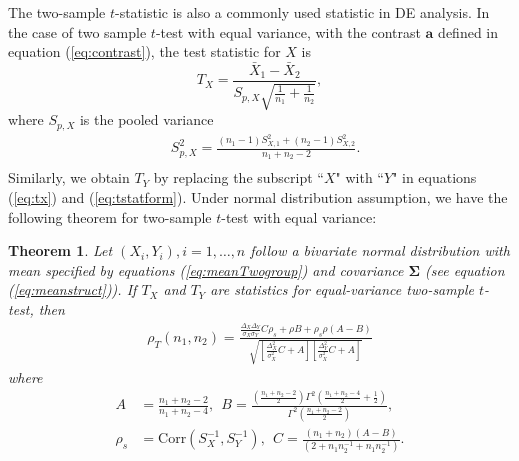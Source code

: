 \documentclass[12pt, a4paper]{article}
\newtheorem{theorem}{Theorem}       %
\newcommand{\cor}{\text{Corr}}
\begin{document}
The two-sample $t$-statistic is also a commonly used statistic in DE 
analysis. In the case of two sample $t$-test with equal variance, with the contrast $\bm a$ 
defined in equation (\ref{eq:contrast}), the test statistic for $X$ is 
\begin{equation}\label{eq:tx}
T_X= \frac{\bar{X}_1- \bar{X}_2}{S_{p, X}\sqrt{\frac{1}{n_1} + \frac{1}{n_2}}},
\end{equation}
where $S_{p, X}$ is the pooled variance
\begin{equation}\label{eq:tstatform}
\begin{aligned}
&S_{p, X}^2 = \frac{(n_1-1)S_{X, 1}^2 + (n_2 -1)S_{X,2}^2}{n_1 + n_2 -2}. \\
\end{aligned}
\end{equation}
Similarly, we obtain $T_Y$ by replacing the subscript ``$X$" with ``$Y$" in equations (\ref{eq:tx}) 
and (\ref{eq:tstatform}). Under normal distribution assumption, we have the following theorem for 
two-sample $t$-test with equal variance:
\begin{theorem}\label{thm:tstat}
	Let $(X_i, Y_i), i = 1, \ldots, n$ follow a bivariate normal distribution with mean 
	specified by equations (\ref{eq:meanTwogroup}) and covariance $\bm \Sigma$ (see equation 
	(\ref{eq:meanstruct})). If $T_X$ and $T_Y$ are statistics for equal-variance two-sample 
	$t$-test, then 
	\begin{equation}\label{eq:ttestcor}
	\begin{aligned}
	\rho_T(n_1, n_2)=   
	\frac{\frac{\Delta_X\Delta_Y}{\sigma_X\sigma_Y}C \rho_{s}+ \rho B
		+ \rho_{s}\rho(A-B)}{\sqrt{\left[ \frac{\Delta_X^2}{\sigma_X^2}C + 
			A\right]\left[\frac{\Delta_Y^2}{\sigma_X^2}C +   A\right]}}
	\end{aligned}
	\end{equation}
	where 
	\begin{equation}\label{eq:AandB}
	\begin{aligned}
	A & = \frac{n_1 + n_2-2}{n_1 + n_2-4}, ~~B =
	\frac{(\frac{n_1 + n_2 -2}{2})\Gamma^2(\frac{n_1 + n_2 -4}{2} + 
		\frac{1}{2})}{\Gamma^2(\frac{n_1+ n_2 -2}{2})}, \\
	\rho_s & = \cor(S_X^{-1}, S_Y^{-1}), ~~ 
	C = \frac{(n_1 + n_2)(A-B)}{(2 + n_1n_2^{-1} + n_1n_2^{-1})}.
	\end{aligned}
	\end{equation}	 
\end{theorem}
\end{document}
